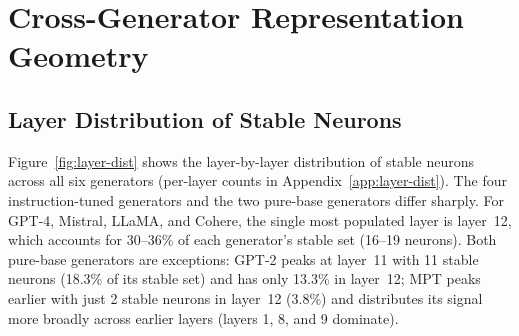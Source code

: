 \documentclass[11pt]{article}
\begin{document}
\begin{table}[t]
\centering
{}%
\caption{Mean-ablation accuracy drop at $k = \text{full}$, 15-cell means $\pm$ std (positive = drop). Sel.\ drop: ablating the per-fold L1-selected set ($k = \text{full}$, 53--92 neurons); Rand.\ drop: mean over 20 random $k$-subsets. Cohere is the only generator substantially above the random baseline.}
\label{tab:ablation-full}
\end{table}

\section{Cross-Generator Representation Geometry}
\label{sec:results-crossgen}

\subsection{Layer Distribution of Stable Neurons}
\label{sec:crossgen-layers}

Figure~\ref{fig:layer-dist} shows the layer-by-layer distribution of stable neurons across all six generators (per-layer counts in Appendix~\ref{app:layer-dist}). The four instruction-tuned generators and the two pure-base generators differ sharply. For GPT-4, Mistral, LLaMA, and Cohere, the single most populated layer is layer~12, which accounts for 30--36\% of each generator's stable set (16--19 neurons). Both pure-base generators are exceptions: GPT-2 peaks at layer~11 with 11 stable neurons (18.3\% of its stable set) and has only 13.3\% in layer~12; MPT peaks earlier with just 2 stable neurons in layer~12 (3.8\%) and distributes its signal more broadly across earlier layers (layers 1, 8, and 9 dominate).
\end{document}
